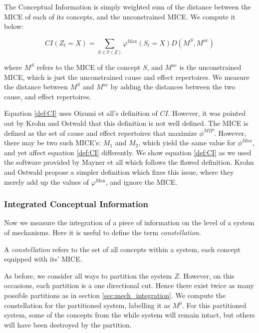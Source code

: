 The Conceptual Information is simply weighted sum of the distance between the MICE of each of its concepts, and the unconstrained MICE. We compute it below:

\begin{equation}
\label{def:CI}
CI(Z_t = X) = \sum \limits_{S \in \mathbb{P}(Z)} \varphi^{\text{Max}}(S_t=X) D(M^S, M^{uc})
\end{equation}

where $M^S$ refers to the MICE of the concept $S$, and $M^{uc}$ is the unconstrained MICE, which is just the unconstrained cause and effect repertoires. We measure the distance between $M^S$ and $M^{uc}$ by adding the distances between the two cause, and effect repertoires.

\begin{remark}
	Equation \ref{def:CI} uses Oizumi et all's \cite{oizumi2014phenomenology} definition of $CI$. However, it was pointed out by Krohn and Ostwald \cite{krohn2016computing} that this definition is not well defined. The MICE is defined as the set of cause and effect repertoires that maximize $\phi^{MIP}$. However, there may be two such MICE's: $M_1$ and $M_2$, which yield the same value for $\phi^{Max}$, and yet affect equation \ref{def:CI} differently. We show equation \ref{def:CI} as we used the software provided by Mayner et all \cite{pyphi} which follows the flawed definition. Krohn and Ostwald propose a simpler definition which fixes this issue, where they merely add up the values of $\varphi^{\text{Max}}$, and ignore the MICE.
\end{remark}

\subsubsection{Integrated Conceptual Information}
Now we measure the integration of a piece of information on the level of a system of mechanisms. Here it is useful to define the term \textit{constellation}.

\begin{definition}
	{A \textit{constellation} refers to the set of all concepts within a system, each concept equipped with its' MICE.}
\end{definition}

As before, we consider all ways to partition the system $Z$. However, on this occasions, each partition is a one directional cut. Hence there exist twice as many possible partitions as in section \ref{sec:mech_integration}. We compute the constellation for the partitioned system, labelling it as $M^p$. For this partitioned system, some of the concepts from the while system will remain intact, but others will have been destroyed by the partition.

